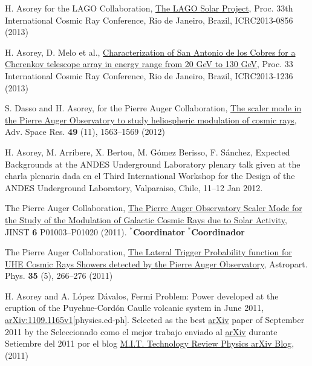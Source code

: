 \begin{etaremune}
\item {}H. Asorey for the LAGO Collaboration, \href{https://www.cbpf.br/~icrc2013/papers/icrc2013-0856.pdf}{The LAGO Solar Project}, \en Proc. 33th International Cosmic Ray Conference, Rio de Janeiro, Brazil, ICRC2013-0856 (2013)

\item {}H. Asorey, D. Melo {{et al.}}, \href{https://www.cbpf.br/~icrc2013/papers/icrc2013-1236.pdf}{Characterization of San Antonio de los Cobres for a Cherenkov telescope array in energy range from 20 GeV to 130 GeV}, \en Proc. 33 International Cosmic Ray Conference, Rio de Janeiro, Brazil, ICRC2013-1236 (2013)

\item {}S. Dasso and H. Asorey, for the Pierre Auger Collaboration, \href{http://dx.doi.org/10.1016/j.asr.2011.12.028}{{ The scaler mode in
the Pierre Auger Observatory to study heliospheric modulation of cosmic rays}}, Adv. Space Res. {\textbf{49}} (11), 1563--1569 (2012)

\item {} H. Asorey, M. Arribere, X. Bertou, M. Gómez Berisso, F. Sánchez,
{{Expected Backgrounds at the ANDES Underground Laboratory}}
\ifeng
plenary talk given at the
\else 
charla plenaria dada en el
\fi
Third International Workshop for the Design of the ANDES Underground Laboratory, Valparaiso, Chile, 11--12 Jan 2012.

\item {}The Pierre Auger Collaboration,
\href{http://dx.doi.org/10.1088/1748-0221/6/01/P01003}{{The Pierre Auger
Observatory Scaler Mode for the Study of the Modulation of Galactic Cosmic Rays
due to Solar Activity}}, JINST {\textbf 6} P01003--P01020 (2011). \ifeng $^*${\textbf{Coordinator}} \else $^*${\textbf{Coordinador}} \fi

\item {} The Pierre Auger Collaboration, \href{http://dx.doi.org/10.1016/j.astropartphys.2011.08.001}{{The Lateral Trigger Probability function for UHE Cosmic Rays Showers detected by the Pierre Auger Observatory}}, Astropart. Phys. {\textbf{35}} (5), 266--276 (2011)

\item {}H. Asorey and A. López Dávalos, {{Fermi Problem: Power developed at the eruption of the Puyehue-Cordón Caulle volcanic system in June
2011}}, \href{http://arxiv.org/abs/1109.1165}{arXiv:1109.1165v1}[physics.ed-ph]. \ifeng Selected as the best \href{http://arxiv.org}{arXiv} paper of September 2011 by the \else Seleccionado como el mejor trabajo enviado al \href{http://arxiv.org}{arXiv} durante Setiembre del 2011 por el blog \fi \href{http://www.technologyreview.com/blog/arxiv/27140/}{M.I.T. Technology Review Physics arXiv Blog}, (2011)


\end{etaremune}
